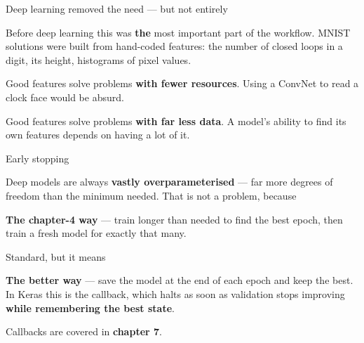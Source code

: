 \documentclass[aspectratio=169,11pt,t]{beamer}
\begin{document}
\begin{frame}[shrink=25]{Deep learning removed the need --- but not entirely}
{\fontsize{9.4}{12.6}\selectfont\color{fg2}Before deep learning this was \textbf{the} most important part of the workflow. MNIST solutions were built from hand-coded features: the number of closed loops in a digit, its height, histograms of pixel values.\par}\vskip 4pt
\begin{minipage}[t]{0.494\textwidth}
\begin{icardgood}
Good features solve problems \textbf{with fewer resources}. Using a ConvNet to read a clock face would be absurd.
\end{icardgood}
\end{minipage}%
\hfill
\begin{minipage}[t]{0.494\textwidth}
\begin{icardgood}
Good features solve problems \textbf{with far less data}. A model's ability to find its own features depends on having a lot of it.
\end{icardgood}
\end{minipage}%
\end{frame}

\begin{frame}[shrink=25]{Early stopping}
{\fontsize{9.4}{12.6}\selectfont\color{fg2}Deep models are always \textbf{vastly overparameterised} --- far more degrees of freedom than the minimum needed. That is not a problem, because \par}\vskip 4pt
\begin{minipage}[t]{0.485\textwidth}
{\fontsize{9.4}{12.6}\selectfont\color{fg2}\textbf{The chapter-4 way} --- train longer than needed to find the best epoch, then train a fresh model for exactly that many.\par}\vskip 4pt
\begin{iband}[amber]
Standard, but it means 
\end{iband}

\end{minipage}%
\hfill
\begin{minipage}[t]{0.485\textwidth}
{\fontsize{9.4}{12.6}\selectfont\color{fg2}\textbf{The better way} --- save the model at the end of each epoch and keep the best. In Keras this is the  callback, which halts as soon as validation stops improving \textbf{while remembering the best state}.\par}\vskip 4pt
\begin{iband}[signal]
Callbacks are covered in \textbf{chapter 7}.
\end{iband}

\end{minipage}%
\end{frame}
\end{document}
